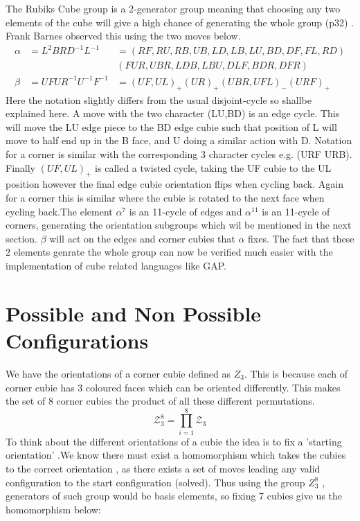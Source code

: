 \documentclass{article}
\begin{document}
The Rubiks Cube group is a 2-generator group meaning that choosing any two elements of the cube will give a high chance of generating the whole group (p32) \cite{Magic}. Frank Barnes observed this using the two moves below.
\begin{align*}
\alpha &= L^{2}BRD^{-1}L^{-1} &= (RF,RU,RB,UB,LD,LB,LU,BD,DF,FL,RD)\\& &(FUR,UBR,LDB,LBU,DLF,BDR,DFR) \\
\beta &= UFUR^{-1}U^{-1}F^{-1} &= (UF,UL)_{+}(UR)_{+}(UBR,UFL)_{-}(URF)_{+} 
\end{align*}
Here the notation slightly differs from the usual disjoint-cycle so shallbe explained here. A move with the two character (LU,BD) is an edge cycle. This will move the LU edge piece to the BD edge cubie such that position of L will move to half end up in the B face, and U doing a similar action with D. Notation for a corner is similar with the corresponding 3 character cycles e.g. (URF URB). Finally $(UF,UL)_{+}$ is called a twisted cycle, taking the UF cubie to the UL position however the final edge cubie orientation flips when cycling back. Again for a corner this is similar where the cubie is rotated to the next face when cycling back.\newline The element $\alpha^{7}$ is an 11-cycle of edges and $\alpha^{11}$ is an 11-cycle of corners, generating the orientation subgroups which wil be mentioned in the next section. $\beta$ will act on the edges and corner cubies that $\alpha$ fixes. The fact that these 2 elements genrate the whole group can now be verified much easier with the implementation of cube related languages like GAP.




\pagebreak
\section{Possible and Non Possible Configurations}


We have the orientations of a corner cubie defined as $Z_3$.
This is because each of corner cubie has 3 coloured faces which can be oriented differently. 
This makes the set of 8 corner cubies the product of all these different permutations.\[\mathcal{Z}_{3}^8 = \prod_{i=1}^{8}\mathcal{Z}_{3}\]
To think about the different orientations of a cubie the idea is to fix a 'starting orientation' .We know there must exist a homomorphism which takes the cubies to the correct orientation , as there exists a set of moves leading any valid configuration to the start configuration (solved). Thus using the group $Z_{3}^{8}$ , generators of such group would be basis elements,  so fixing 7 cubies  give us the homomorphism below: 
\end{document}
